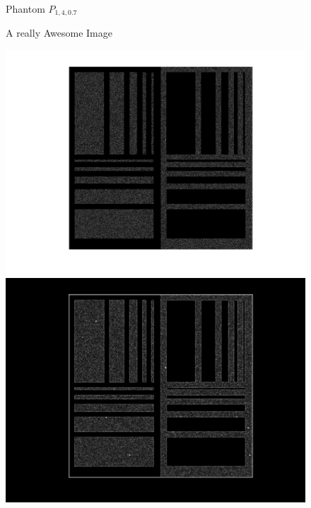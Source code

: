 \documentclass[a4paper]{article} %
\begin{document}
\begin{figure}[!htb]
	\caption{Phantom $P_{1,4,0.7}$}\label{fig:awesome_image1}
\endminipage
\caption{A really Awesome Image}\label{fig:awesome_image3}
\end{figure}

\begin{figure}[!htb]
  \includegraphics[width=\linewidth]{Eq_Phantom_0p000_4_1_1.jpg}
\endminipage\hfill
{}
  \includegraphics[width=\linewidth]{sobel_Eq_Phantom_0p000_4_1_1.jpg}
\endminipage\hfill
{}%

\end{figure}
\end{document}

